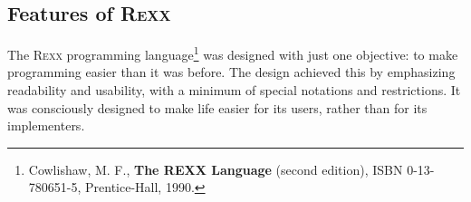 \subsection{Features of R\textsc{exx}}
The R\textsc{exx} programming language\footnote{Cowlishaw, M. F., \textbf{The REXX Language} (second edition), ISBN 0-13-780651-5, Prentice-Hall, 1990.} was designed with just one objective: to make programming easier than it was before. The design achieved this by emphasizing readability and usability, with a minimum of special notations and restrictions. It was consciously designed to make life easier for its users, rather than for its implementers.


